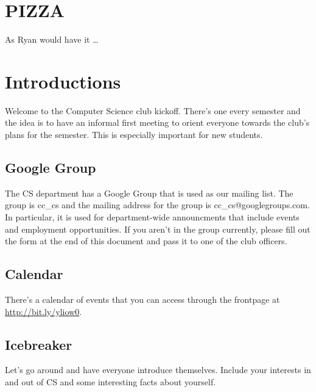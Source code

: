 

\renewcommand\TITLE{CCCS: Spring 2016 Agenda}


\topmatter


\section{PIZZA}
\label{sec:orgheadline1}

As Ryan would have it \ldots{}


\newpage


\section{Introductions}
\label{sec:orgheadline5}

Welcome to the Computer Science club kickoff. There's one every semester
and the idea is to have an informal first meeting to orient everyone towards
the club's plans for the semester. This is especially important for new
students.

\subsection{Google Group}
\label{sec:orgheadline2}

The CS department has a Google Group that is used as our mailing list. The
group is cc\_cs and the mailing address for the group is cc\_cs@googlegroups.com.
In particular, it is used for department-wide announcments that include events
and employment opportunities. If you aren't in the group currently, please fill
out the form at the end of this document and pass it to one of the club officers.

\subsection{Calendar}
\label{sec:orgheadline3}

There's a calendar of events that you can access through the frontpage at
\url{http://bit.ly/yliow0}.

\subsection{Icebreaker}
\label{sec:orgheadline4}

Let's go around and have everyone introduce themselves. Include your interests
in and out of CS and some interesting facts about yourself.


\newpage


